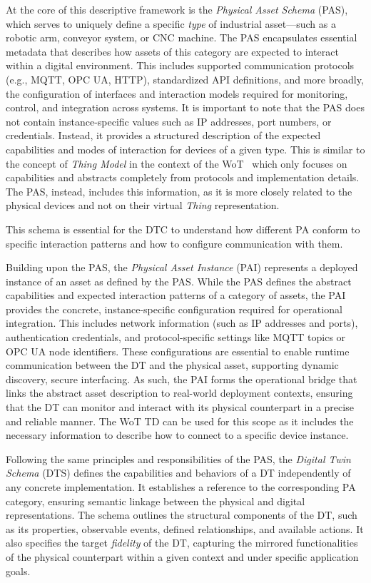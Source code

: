 At the core of this descriptive framework is the \textit{Physical Asset Schema} (PAS), which serves to uniquely define a specific \textit{type} of industrial asset---such as a robotic arm, conveyor system, or CNC machine.
%
The PAS encapsulates essential metadata that describes how assets of this category are expected to interact within a digital environment. This includes supported communication protocols (e.g., MQTT, OPC UA, HTTP), standardized API definitions, and more broadly, the configuration of interfaces and interaction models required for monitoring, control, and integration across systems. It is important to note that the PAS does not contain instance-specific values such as IP addresses, port numbers, or credentials. Instead, it provides a structured description of the expected capabilities and modes of interaction for devices of a given type.
%
This is similar to the concept of \emph{Thing Model} in the context of the \ac{WoT}~\cite{wot-td} which only focuses on capabilities and abstracts completely from protocols and implementation details. The PAS, instead, includes this information, as it is more closely related to the physical devices and not on their virtual \emph{Thing} representation. 

This schema is essential for the \ac{DTC} to understand how different \ac{PA} conform to specific interaction patterns and how to configure communication with them. 

Building upon the PAS, the \textit{Physical Asset Instance} (PAI) represents a deployed instance of an asset as defined by the PAS.
%
While the PAS defines the abstract capabilities and expected interaction patterns of a category of assets, the PAI provides the concrete, instance-specific configuration required for operational integration. This includes network information (such as IP addresses and ports), authentication credentials, and protocol-specific settings like MQTT topics or OPC UA node identifiers.
%
These configurations are essential to enable runtime communication between the DT and the physical asset, supporting dynamic discovery, secure interfacing. As such, the PAI forms the operational bridge that links the abstract asset description to real-world deployment contexts, ensuring that the DT can monitor and interact with its physical counterpart in a precise and reliable manner.
%
The \ac{WoT} \ac{TD} can be used for this scope as it includes the necessary information to describe how to connect to a specific device instance.

Following the same principles and responsibilities of the PAS, the \textit{Digital Twin Schema} (DTS) defines the capabilities and behaviors of a DT independently of any concrete implementation.
%
It establishes a reference to the corresponding \ac{PA} category, ensuring semantic linkage between the physical and digital representations. The schema outlines the structural components of the DT, such as its properties, observable events, defined relationships, and available actions. It also specifies the target \emph{fidelity} of the DT, capturing the mirrored functionalities of the physical counterpart within a given context and under specific application goals.

